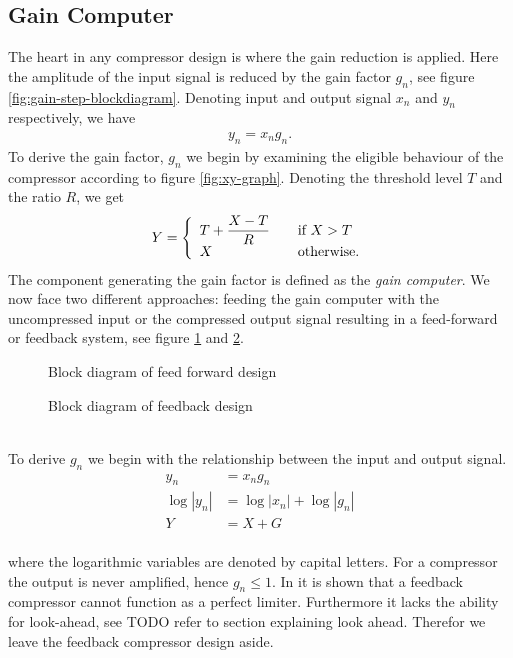 \documentclass[]{article}
\begin{document}
\subsection{Gain Computer}
The heart in any compressor design is where the gain reduction is applied. Here the amplitude of the input signal is reduced by the gain factor $g_n$, see figure \ref{fig:gain-step-blockdiagram}. Denoting input and output signal $x_n$ and $y_n$ respectively, we have
\begin{align}
y_n = x_n g_n.
\label{eq:inout}
\end{align}
To derive the gain factor, $g_n$ we begin by examining the eligible behaviour of the compressor according to figure \ref{fig:xy-graph}. Denoting the threshold level $T$ and the ratio $R$, we get
\begin{equation} \label{eq:gaincomp}
Y = \left\{ 
  \begin{array}{l l}
    T+ \dfrac{X-T}{R} & \quad \text{if $X > T$}\\
    X & \quad \text{otherwise.}
  \end{array} \right.
\end{equation}
The component generating the gain factor is defined as the \emph{gain computer}. We now face two different approaches: feeding the gain computer with the uncompressed input or the compressed output signal resulting in a feed-forward or feedback system, see figure \ref{fig:feedforward-blockdiagram} and \ref{fig:feedback-blockdiagram}. 
\begin{figure}[ht]
 \centering

\caption{Block diagram of feed forward design}
\label{fig:feedforward-blockdiagram}
\end{figure}
\begin{figure}[ht]
\centering

\caption{Block diagram of feedback design} 
\label{fig:feedback-blockdiagram}
\end{figure}
\\ To derive $g_n$ we begin with the relationship between the input and output signal.
\begin{align}
y_n &= x_ng_n   \\
\log|y_n| & = \log|x_n| + \log|g_n|   \\
Y &= X + G \label{eq:cv}
\end{align}
\\ where the logarithmic variables are denoted by capital letters. For a compressor the output is never amplified, hence $g_n \leq 1$. In \cite{giannoullis} it is shown that a feedback compressor cannot function as a perfect limiter. Furthermore it lacks the ability for look-ahead, see TODO refer to section explaining look ahead. Therefor we leave the feedback compressor design aside. 
\end{document}
